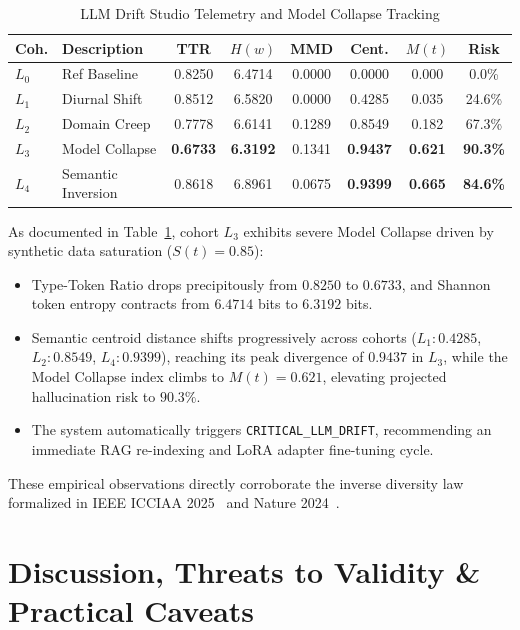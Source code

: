\documentclass[conference]{IEEEtran}
\begin{document}
\begin{table}[htbp]
\caption{LLM Drift Studio Telemetry and Model Collapse Tracking}
\label{tab:llm_drift_results}
\centering
\scriptsize
\setlength{\tabcolsep}{2.5pt}
\begin{tabularx}{\columnwidth}{l>{\raggedright\arraybackslash}Xcccccc}
\toprule
\textbf{Coh.} & \textbf{Description} & \textbf{TTR} & \textbf{$H(w)$} & \textbf{MMD} & \textbf{Cent.} & \textbf{$M(t)$} & \textbf{Risk} \\
\midrule
$L_0$ & Ref Baseline & 0.8250 & 6.4714 & 0.0000 & 0.0000 & 0.000 & 0.0\% \\
$L_1$ & Diurnal Shift & 0.8512 & 6.5820 & 0.0000 & 0.4285 & 0.035 & 24.6\% \\
$L_2$ & Domain Creep & 0.7778 & 6.6141 & 0.1289 & 0.8549 & 0.182 & 67.3\% \\
$L_3$ & Model Collapse & \textbf{0.6733} & \textbf{6.3192} & 0.1341 & \textbf{0.9437} & \textbf{0.621} & \textbf{90.3\%} \\
$L_4$ & Semantic Inversion & 0.8618 & 6.8961 & 0.0675 & \textbf{0.9399} & \textbf{0.665} & \textbf{84.6\%} \\
\bottomrule
\end{tabularx}
\end{table}

As documented in Table~\ref{tab:llm_drift_results}, cohort $L_3$ exhibits severe Model Collapse driven by synthetic data saturation ($S(t) = 0.85$):
\begin{itemize}
    \item Type-Token Ratio drops precipitously from $0.8250$ to $0.6733$, and Shannon token entropy contracts from $6.4714$ bits to $6.3192$ bits.
    \item Semantic centroid distance shifts progressively across cohorts ($L_1: 0.4285$, $L_2: 0.8549$, $L_4: 0.9399$), reaching its peak divergence of $0.9437$ in $L_3$, while the Model Collapse index climbs to $M(t) = 0.621$, elevating projected hallucination risk to $90.3\%$.
    \item The system automatically triggers \texttt{CRITICAL\_LLM\_DRIFT}, recommending an immediate RAG re-indexing and LoRA adapter fine-tuning cycle.
\end{itemize}
These empirical observations directly corroborate the inverse diversity law formalized in IEEE ICCIAA 2025~\cite{hajmohammed2025concept} and Nature 2024~\cite{shumailov2024ai}.

\section{Discussion, Threats to Validity \& Practical Caveats}
\end{document}
